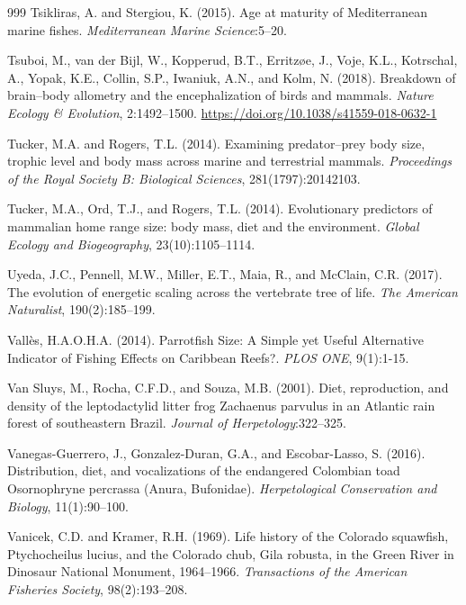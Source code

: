 \begin{thebibliography}{999}
Tsikliras, A. and Stergiou, K. (2015). Age at maturity of Mediterranean marine fishes. \textit{Mediterranean Marine Science}:5--20.

Tsuboi, M., van der Bijl, W., Kopperud, B.T., Erritz{\o}e, J., Voje, K.L., Kotrschal, A., Yopak, K.E., Collin, S.P., Iwaniuk, A.N., and Kolm, N. (2018). Breakdown of brain--body allometry and the encephalization of birds and mammals. \textit{Nature Ecology \& Evolution}, 2:1492--1500. \url{https://doi.org/10.1038/s41559-018-0632-1}

Tucker, M.A. and Rogers, T.L. (2014). Examining predator--prey body size, trophic level and body mass across marine and terrestrial mammals. \textit{Proceedings of the Royal Society B: Biological Sciences}, 281(1797):20142103.

Tucker, M.A., Ord, T.J., and Rogers, T.L. (2014). Evolutionary predictors of mammalian home range size: body mass, diet and the environment. \textit{Global Ecology and Biogeography}, 23(10):1105--1114.

Uyeda, J.C., Pennell, M.W., Miller, E.T., Maia, R., and McClain, C.R. (2017). The evolution of energetic scaling across the vertebrate tree of life. \textit{The American Naturalist}, 190(2):185--199.

Vall{\`e}s, H.A.O.H.A. (2014). Parrotfish Size: A Simple yet Useful Alternative Indicator of Fishing Effects on Caribbean Reefs?. \textit{PLOS ONE}, 9(1):1-15.

Van Sluys, M., Rocha, C.F.D., and Souza, M.B. (2001). Diet, reproduction, and density of the leptodactylid litter frog Zachaenus parvulus in an Atlantic rain forest of southeastern Brazil. \textit{Journal of Herpetology}:322--325.

Vanegas-Guerrero, J., Gonzalez-Duran, G.A., and Escobar-Lasso, S. (2016). Distribution, diet, and vocalizations of the endangered Colombian toad Osornophryne percrassa (Anura, Bufonidae). \textit{Herpetological Conservation and Biology}, 11(1):90--100.

Vanicek, C.D. and Kramer, R.H. (1969). Life history of the Colorado squawfish, Ptychocheilus lucius, and the Colorado chub, Gila robusta, in the Green River in Dinosaur National Monument, 1964--1966. \textit{Transactions of the American Fisheries Society}, 98(2):193--208.


\end{thebibliography}
